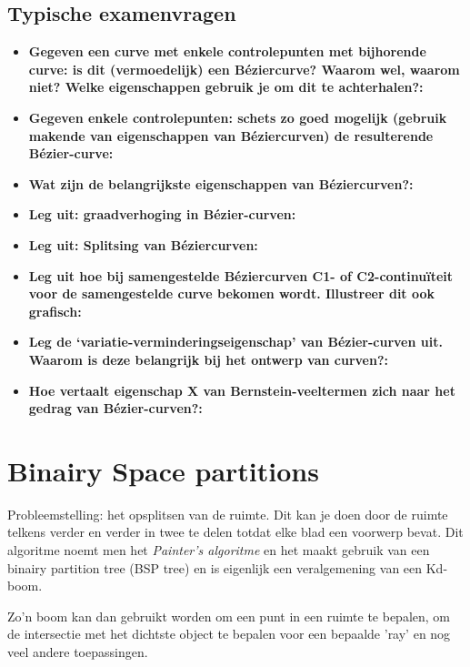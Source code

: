 \documentclass[12pt,a4paper]{article}
\begin{document}
	
	\subsection{Typische examenvragen}
	\begin{itemize}
		\item \textbf{Gegeven een curve met enkele controlepunten met bijhorende curve: is dit (vermoedelijk) een Béziercurve? Waarom wel, waarom niet? Welke eigenschappen gebruik je om dit te achterhalen?:}\\
		\item \textbf{Gegeven enkele controlepunten: schets zo goed mogelijk (gebruik makende van eigenschappen van Béziercurven) de resulterende Bézier-curve:}\\
		\item \textbf{Wat zijn de belangrijkste eigenschappen van Béziercurven?:}\\
		\item \textbf{Leg uit: graadverhoging in Bézier-curven:}\\
		\item \textbf{Leg uit: Splitsing van Béziercurven:}\\
		\item \textbf{Leg uit hoe bij samengestelde Béziercurven C1- of C2-continuïteit voor de samengestelde curve bekomen wordt. Illustreer dit ook grafisch:}\\
		\item \textbf{Leg de ‘variatie-verminderingseigenschap’ van Bézier-curven uit. Waarom is deze belangrijk bij het ontwerp van curven?:}\\
		\item \textbf{Hoe vertaalt eigenschap X van Bernstein-veeltermen zich naar het gedrag van Bézier-curven?:}\\
	\end{itemize}
	
	
	
	\section{Binairy Space partitions}
	Probleemstelling: het opsplitsen van de ruimte. Dit kan je doen door de ruimte telkens verder en verder in twee te delen totdat elke blad een voorwerp bevat. Dit algoritme noemt men het \textit{Painter's algoritme} en het maakt gebruik van een binairy partition tree (BSP tree) en is eigenlijk een veralgemening van een Kd-boom. 
	
	Zo'n boom kan dan gebruikt worden om een punt in een ruimte te bepalen, om de intersectie met het dichtste object te bepalen voor een bepaalde 'ray' en nog veel andere toepassingen. 
	
\end{document}
